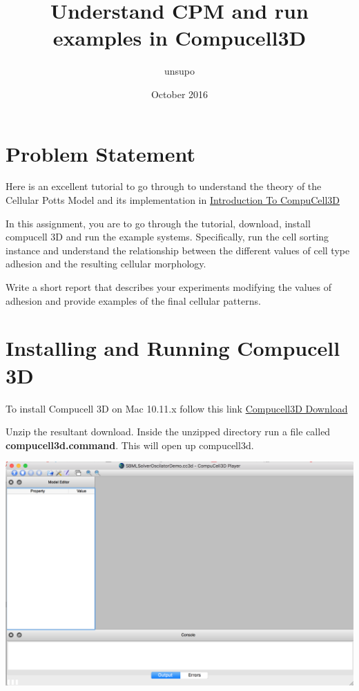 \documentclass{article}
\title{Understand CPM and run examples in Compucell3D}
\author{unsupo }
\date{October 2016}
\begin{document}
\maketitle

\tableofcontents

\section{Problem Statement}
Here is an excellent tutorial to go through to understand the theory of the Cellular Potts Model and its implementation in 
\href{http://www.compucell3d.org/BinDoc/cc3d_binaries/Manuals/Introduction_To_CompuCell3D_v.3.6.2.pdf}{Introduction To CompuCell3D}

In this assignment, you are to go through the tutorial, download, install compucell 3D and run the example systems. Specifically, run the cell sorting instance and understand the relationship between the different values of cell type adhesion and the resulting cellular morphology.

Write a short report that describes your experiments modifying the values of adhesion and provide examples of the final cellular patterns.

\newpage
\section{Installing and Running Compucell 3D}
To install Compucell 3D on Mac 10.11.x follow this link \href{https://sourceforge.net/projects/cc3d/files/3.7.5/mac/elcapitan-10.11/}{Compucell3D Download}

Unzip the resultant download.  Inside the unzipped directory run a file called \textbf{compucell3d.command}.  This will open up compucell3d.

{\includegraphics[width=\textwidth]{compucell3d}
\centering}
\end{document}
